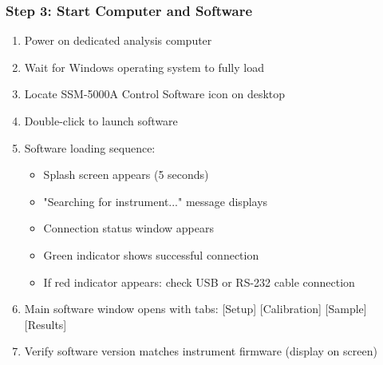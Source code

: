 \documentclass[11pt,a4paper]{article}\usepackage[]{graphicx}\usepackage[]{xcolor}
\begin{document}
\subsubsection{Step 3: Start Computer and Software}
\begin{enumerate}[noitemsep]
    \item Power on dedicated analysis computer
    \item Wait for Windows operating system to fully load
    \item Locate SSM-5000A Control Software icon on desktop
    \item Double-click to launch software
    \item Software loading sequence:
    \begin{itemize}
        \item Splash screen appears (5 seconds)
        \item "Searching for instrument..." message displays
        \item Connection status window appears
        \item Green indicator shows successful connection
        \item If red indicator appears: check USB or RS-232 cable connection
    \end{itemize}
    \item Main software window opens with tabs: [Setup] [Calibration] [Sample] [Results]
    \item Verify software version matches instrument firmware (display on screen)
\end{enumerate}
\end{document}
